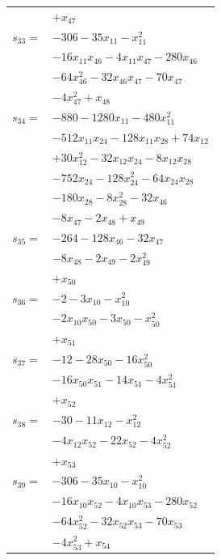 \begin{longtable}{@{}r@{\;}l@{}}
 & \(\displaystyle +x_{47}\) \\[3pt]
\(s_{33}=\) & \(\displaystyle -306 -35x_{11} -x_{11}^{2}\) \\
 & \(\displaystyle -16x_{11}x_{46} -4x_{11}x_{47} -280x_{46}\) \\
 & \(\displaystyle -64x_{46}^{2} -32x_{46}x_{47} -70x_{47}\) \\
 & \(\displaystyle -4x_{47}^{2} +x_{48}\) \\[3pt]
\(s_{34}=\) & \(\displaystyle -880 -1280x_{11} -480x_{11}^{2}\) \\
 & \(\displaystyle -512x_{11}x_{24} -128x_{11}x_{28} +74x_{12}\) \\
 & \(\displaystyle +30x_{12}^{2} -32x_{12}x_{24} -8x_{12}x_{28}\) \\
 & \(\displaystyle -752x_{24} -128x_{24}^{2} -64x_{24}x_{28}\) \\
 & \(\displaystyle -180x_{28} -8x_{28}^{2} -32x_{46}\) \\
 & \(\displaystyle -8x_{47} -2x_{48} +x_{49}\) \\[3pt]
\(s_{35}=\) & \(\displaystyle -264 -128x_{46} -32x_{47}\) \\
 & \(\displaystyle -8x_{48} -2x_{49} -2x_{49}^{2}\) \\
 & \(\displaystyle +x_{50}\) \\[3pt]
\(s_{36}=\) & \(\displaystyle -2 -3x_{10} -x_{10}^{2}\) \\
 & \(\displaystyle -2x_{10}x_{50} -3x_{50} -x_{50}^{2}\) \\
 & \(\displaystyle +x_{51}\) \\[3pt]
\(s_{37}=\) & \(\displaystyle -12 -28x_{50} -16x_{50}^{2}\) \\
 & \(\displaystyle -16x_{50}x_{51} -14x_{51} -4x_{51}^{2}\) \\
 & \(\displaystyle +x_{52}\) \\[3pt]
\(s_{38}=\) & \(\displaystyle -30 -11x_{12} -x_{12}^{2}\) \\
 & \(\displaystyle -4x_{12}x_{52} -22x_{52} -4x_{52}^{2}\) \\
 & \(\displaystyle +x_{53}\) \\[3pt]
\(s_{39}=\) & \(\displaystyle -306 -35x_{10} -x_{10}^{2}\) \\
 & \(\displaystyle -16x_{10}x_{52} -4x_{10}x_{53} -280x_{52}\) \\
 & \(\displaystyle -64x_{52}^{2} -32x_{52}x_{53} -70x_{53}\) \\
 & \(\displaystyle -4x_{53}^{2} +x_{54}\) \\[3pt]

\end{longtable}
